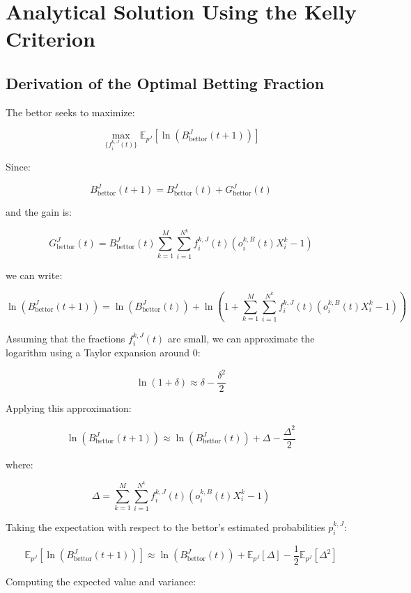 
\chapter{Analytical Solution Using the Kelly Criterion}
\label{appendix:analytical_solution_using_the_kelly_criterion}


\section{Derivation of the Optimal Betting Fraction}

The bettor seeks to maximize:

\[
\max_{\{ f_i^{k,J}(t) \}} \mathbb{E}_{p^{J}}\left[ \ln\left( B_{\text{bettor}}^J(t+1) \right) \right]
\]

Since:

\[
B_{\text{bettor}}^J(t+1) = B_{\text{bettor}}^J(t) + G_{\text{bettor}}^J(t)
\]

and the gain is:

\[
G_{\text{bettor}}^J(t) = B_{\text{bettor}}^J(t) \sum_{k=1}^M \sum_{i=1}^{N^k} f_i^{k,J}(t) \left( o_i^{k,B}(t) X_i^k - 1 \right)
\]

we can write:

\[
\ln\left( B_{\text{bettor}}^J(t+1) \right) = \ln\left( B_{\text{bettor}}^J(t) \right) + \ln\left( 1 + \sum_{k=1}^M \sum_{i=1}^{N^k} f_i^{k,J}(t) \left( o_i^{k,B}(t) X_i^k - 1 \right) \right)
\]

Assuming that the fractions \( f_i^{k,J}(t) \) are small, we can approximate the logarithm using a Taylor expansion around 0:

\[
\ln(1 + \delta) \approx \delta - \frac{\delta^2}{2}
\]

Applying this approximation:

\[
\ln\left( B_{\text{bettor}}^J(t+1) \right) \approx \ln\left( B_{\text{bettor}}^J(t) \right) + \Delta - \frac{\Delta^2}{2}
\]

where:

\[
\Delta = \sum_{k=1}^M \sum_{i=1}^{N^k} f_i^{k,J}(t) \left( o_i^{k,B}(t) X_i^k - 1 \right)
\]

Taking the expectation with respect to the bettor's estimated probabilities \( p_i^{k,J} \):

\[
\mathbb{E}_{p^{J}}\left[ \ln\left( B_{\text{bettor}}^J(t+1) \right) \right] \approx \ln\left( B_{\text{bettor}}^J(t) \right) + \mathbb{E}_{p^{J}}\left[ \Delta \right] - \frac{1}{2} \mathbb{E}_{p^{J}}\left[ \Delta^2 \right]
\]

Computing the expected value and variance:

